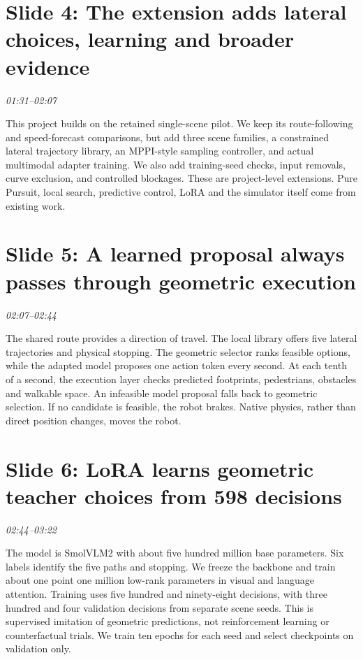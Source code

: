 \documentclass[a4paper,11pt]{article}
\begin{document}
\section*{Slide 4: The extension adds lateral choices, learning and broader evidence}
\textit{01:31--02:07}

This project builds on the retained single-scene pilot. We keep its route-following and speed-forecast comparisons, but add three scene families, a constrained lateral trajectory library, an MPPI-style sampling controller, and actual multimodal adapter training. We also add training-seed checks, input removals, curve exclusion, and controlled blockages. These are project-level extensions. Pure Pursuit, local search, predictive control, LoRA and the simulator itself come from existing work.

\section*{Slide 5: A learned proposal always passes through geometric execution}
\textit{02:07--02:44}

The shared route provides a direction of travel. The local library offers five lateral trajectories and physical stopping. The geometric selector ranks feasible options, while the adapted model proposes one action token every second. At each tenth of a second, the execution layer checks predicted footprints, pedestrians, obstacles and walkable space. An infeasible model proposal falls back to geometric selection. If no candidate is feasible, the robot brakes. Native physics, rather than direct position changes, moves the robot.

\section*{Slide 6: LoRA learns geometric teacher choices from 598 decisions}
\textit{02:44--03:22}

The model is SmolVLM2 with about five hundred million base parameters. Six labels identify the five paths and stopping. We freeze the backbone and train about one point one million low-rank parameters in visual and language attention. Training uses five hundred and ninety-eight decisions, with three hundred and four validation decisions from separate scene seeds. This is supervised imitation of geometric predictions, not reinforcement learning or counterfactual trials. We train ten epochs for each seed and select checkpoints on validation only.
\end{document}
